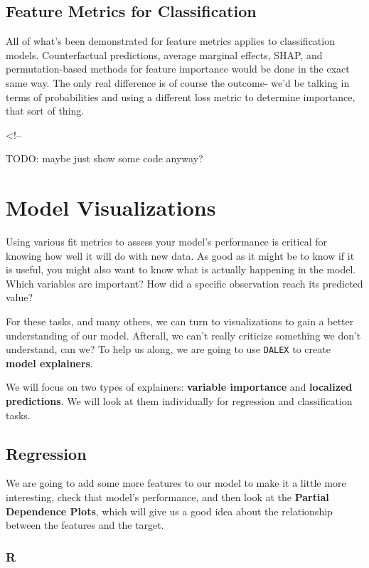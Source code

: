 \documentclass[
  letterpaper,
]{krantz}
\begin{document}
\subsection{Feature Metrics for
Classification}\label{feature-metrics-for-classification}

All of what's been demonstrated for feature metrics applies to
classification models. Counterfactual predictions, average marginal
effects, SHAP, and permutation-based methods for feature importance
would be done in the exact same way. The only real difference is of
course the outcome- we'd be talking in terms of probabilities and using
a different loss metric to determine importance, that sort of thing.

\textless!--

TODO: maybe just show some code anyway?

\section{Model Visualizations}\label{model-visualizations}

Using various fit metrics to assess your model's performance is critical
for knowing how well it will do with new data. As good as it might be to
know if it is useful, you might also want to know what is actually
happening in the model. Which variables are important? How did a
specific observation reach its predicted value?

For these tasks, and many others, we can turn to visualizations to gain
a better understanding of our model. Afterall, we can't really criticize
something we don't understand, can we? To help us along, we are going to
use \texttt{DALEX} to create \textbf{model explainers}.

We will focus on two types of explainers: \textbf{variable importance}
and \textbf{localized predictions}. We will look at them individually
for regression and classification tasks.

\subsection{Regression}\label{regression}

We are going to add some more features to our model to make it a little
more interesting, check that model's performance, and then look at the
\textbf{Partial Dependence Plots}, which will give us a good idea about
the relationship between the features and the target.

\subsubsection{R}
\end{document}
